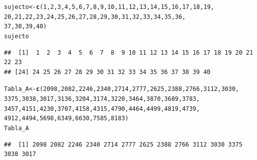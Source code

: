 \documentclass[12pt,letterpaper]{article}\usepackage[]{graphicx}\usepackage[]{color}
\makeatletter
\newcommand{\hlnum}[1]{\textcolor[rgb]{0.686,0.059,0.569}{#1}}%
\newcommand{\hlstd}[1]{\textcolor[rgb]{0.345,0.345,0.345}{#1}}%
\newcommand{\hlkwb}[1]{\textcolor[rgb]{0.69,0.353,0.396}{#1}}%
\newcommand{\hlkwd}[1]{\textcolor[rgb]{0.737,0.353,0.396}{\textbf{#1}}}%
\newenvironment{kframe}{%
 \def\at@end@of@kframe{}%
 \ifinner\ifhmode%
  \def\at@end@of@kframe{\end{minipage}}%
  \begin{minipage}{\columnwidth}%
 \fi\fi%
 \def\FrameCommand##1{\hskip\@totalleftmargin \hskip-\fboxsep
 \colorbox{shadecolor}{##1}\hskip-\fboxsep
     \hskip-\linewidth \hskip-\@totalleftmargin \hskip\columnwidth}%
 \MakeFramed {\advance\hsize-\width
   \@totalleftmargin\z@ \linewidth\hsize
   \@setminipage}}%
 {\par\unskip\endMakeFramed%
 \at@end@of@kframe}
\newenvironment{knitrout}{}{} %
\makeatother
\begin{document}
\begin{knitrout}
\color{fgcolor}\begin{kframe}
\begin{alltt}
\hlstd{sujecto} \hlkwb{<-} \hlkwd{c}\hlstd{(}\hlnum{1}\hlstd{,} \hlnum{2}\hlstd{,} \hlnum{3}\hlstd{,} \hlnum{4}\hlstd{,} \hlnum{5}\hlstd{,} \hlnum{6}\hlstd{,} \hlnum{7}\hlstd{,} \hlnum{8}\hlstd{,} \hlnum{9}\hlstd{,} \hlnum{10}\hlstd{,} \hlnum{11}\hlstd{,} \hlnum{12}\hlstd{,} \hlnum{13}\hlstd{,} \hlnum{14}\hlstd{,} \hlnum{15}\hlstd{,} \hlnum{16}\hlstd{,} \hlnum{17}\hlstd{,} \hlnum{18}\hlstd{,} \hlnum{19}\hlstd{,}
             \hlnum{20}\hlstd{,} \hlnum{21}\hlstd{,} \hlnum{22}\hlstd{,} \hlnum{23}\hlstd{,} \hlnum{24}\hlstd{,} \hlnum{25}\hlstd{,} \hlnum{26}\hlstd{,} \hlnum{27}\hlstd{,} \hlnum{28}\hlstd{,} \hlnum{29}\hlstd{,} \hlnum{30}\hlstd{,} \hlnum{31}\hlstd{,} \hlnum{32}\hlstd{,} \hlnum{33}\hlstd{,} \hlnum{34}\hlstd{,} \hlnum{35}\hlstd{,} \hlnum{36}\hlstd{,}
             \hlnum{37}\hlstd{,} \hlnum{38}\hlstd{,} \hlnum{39}\hlstd{,} \hlnum{40}\hlstd{)}
\hlstd{sujecto}
\end{alltt}
\begin{verbatim}
##  [1]  1  2  3  4  5  6  7  8  9 10 11 12 13 14 15 16 17 18 19 20 21 22 23
## [24] 24 25 26 27 28 29 30 31 32 33 34 35 36 37 38 39 40
\end{verbatim}
\begin{alltt}
\hlstd{Tabla_A} \hlkwb{<-} \hlkwd{c}\hlstd{(}\hlnum{2098}\hlstd{,} \hlnum{2082}\hlstd{,} \hlnum{2246}\hlstd{,} \hlnum{2340}\hlstd{,} \hlnum{2714}\hlstd{,} \hlnum{2777}\hlstd{,} \hlnum{2625}\hlstd{,} \hlnum{2388}\hlstd{,} \hlnum{2766}\hlstd{,} \hlnum{3112}\hlstd{,} \hlnum{3030}\hlstd{,}
             \hlnum{3375}\hlstd{,} \hlnum{3038}\hlstd{,} \hlnum{3017}\hlstd{,} \hlnum{3136}\hlstd{,} \hlnum{3204}\hlstd{,} \hlnum{3174}\hlstd{,} \hlnum{3220}\hlstd{,} \hlnum{3464}\hlstd{,} \hlnum{3870}\hlstd{,} \hlnum{3689}\hlstd{,} \hlnum{3783}\hlstd{,}
             \hlnum{3457}\hlstd{,} \hlnum{4151}\hlstd{,} \hlnum{4230}\hlstd{,} \hlnum{3707}\hlstd{,} \hlnum{4158}\hlstd{,} \hlnum{4315}\hlstd{,} \hlnum{4790}\hlstd{,} \hlnum{4464}\hlstd{,} \hlnum{4499}\hlstd{,} \hlnum{4819}\hlstd{,} \hlnum{4739}\hlstd{,}
             \hlnum{4912}\hlstd{,} \hlnum{4494}\hlstd{,} \hlnum{5698}\hlstd{,} \hlnum{6349}\hlstd{,} \hlnum{6630}\hlstd{,} \hlnum{7585}\hlstd{,}\hlnum{8183}\hlstd{)}
\hlstd{Tabla_A}
\end{alltt}
\begin{verbatim}
##  [1] 2098 2082 2246 2340 2714 2777 2625 2388 2766 3112 3030 3375 3038 3017

\end{verbatim}
\end{kframe}
\end{knitrout}
\end{document}
